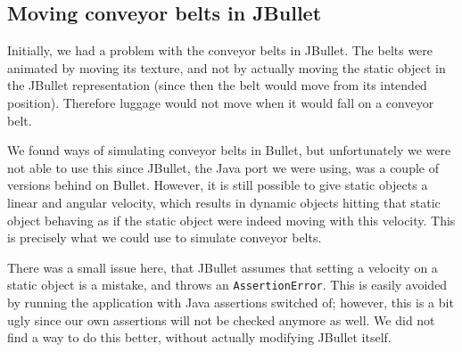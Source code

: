 \subsection{Moving conveyor belts in JBullet}
Initially, we had a problem with the conveyor belts in JBullet. The belts were animated by moving its texture, and not by actually moving the static object in the JBullet representation (since then the belt would move from its intended position). Therefore luggage would not move when it would fall on a conveyor belt.

We found ways of simulating conveyor belts in Bullet, but unfortunately we were not able to use this since JBullet, the Java port we were using, was a couple of versions behind on Bullet. However, it is still possible to give static objects a linear and angular velocity, which results in dynamic objects hitting that static object behaving as if the static object were indeed moving with this velocity. This is precisely what we could use to simulate conveyor belts.

There was a small issue here, that JBullet assumes that setting a velocity on a static object is a mistake, and throws an \texttt{AssertionError}. This is easily avoided by running the application with Java assertions switched of; however, this is a bit ugly since our own assertions will not be checked anymore as well. We did not find a way to do this better, without actually modifying JBullet itself.